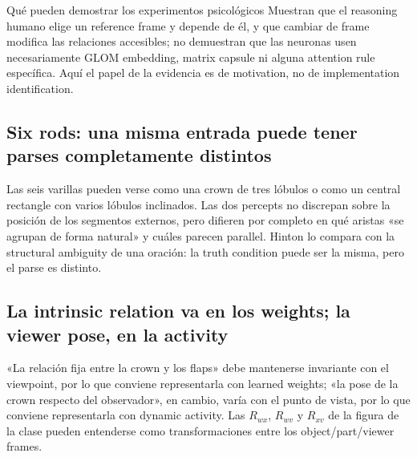 \begin{knowledgebox}{Qué pueden demostrar los experimentos psicológicos}
Muestran que el reasoning humano elige un reference frame y depende de él, y que cambiar de frame modifica las relaciones accesibles; no demuestran que las neuronas usen necesariamente GLOM embedding, matrix capsule ni alguna attention rule específica. Aquí el papel de la evidencia es de motivation, no de implementation identification.
\end{knowledgebox}

\subsection{Six rods: una misma entrada puede tener parses completamente distintos}

Las seis varillas pueden verse como una crown de tres lóbulos o como un central rectangle con varios lóbulos inclinados. Las dos percepts no discrepan sobre la posición de los segmentos externos, pero difieren por completo en qué aristas «se agrupan de forma natural» y cuáles parecen parallel. Hinton lo compara con la structural ambiguity de una oración: la truth condition puede ser la misma, pero el parse es distinto.




\subsection{La intrinsic relation va en los weights; la viewer pose, en la activity}

«La relación fija entre la crown y los flaps» debe mantenerse invariante con el viewpoint, por lo que conviene representarla con learned weights; «la pose de la crown respecto del observador», en cambio, varía con el punto de vista, por lo que conviene representarla con dynamic activity. Las $R_{wx}$, $R_{wv}$ y $R_{xv}$ de la figura de la clase pueden entenderse como transformaciones entre los object/part/viewer frames.

